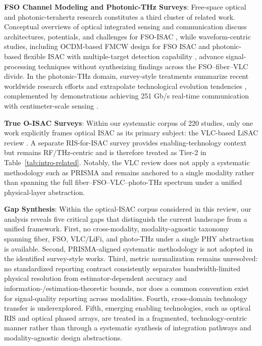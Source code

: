\textbf{FSO Channel Modeling and Photonic-THz Surveys}: Free-space optical and photonic-terahertz research constitutes a third cluster of related work. Conceptual overviews of optical integrated sensing and communication discuss architectures, potentials, and challenges for FSO-ISAC \cite{O_ISAC_021}, while waveform-centric studies, including OCDM-based FMCW design for FSO ISAC \cite{O_ISAC_035} and photonic-based flexible ISAC with multiple-target detection capability \cite{O_ISAC_058}, advance signal-processing techniques without synthesizing findings across the FSO--fiber--VLC divide. In the photonic-THz domain, survey-style treatments summarize recent worldwide research efforts and extrapolate technological evolution tendencies \cite{O_ISAC_070}, complemented by demonstrations achieving 251 Gb/s real-time communication with centimeter-scale sensing \cite{O_ISAC_016}.

\textbf{True O-ISAC Surveys}: Within our systematic corpus of 220 studies, only one work explicitly frames optical ISAC as its primary subject: the VLC-based LiSAC review \cite{O_ISAC_303}. A separate RIS-for-ISAC survey \cite{O_ISAC_163} provides enabling-technology context but remains RF/THz-centric and is therefore treated as Tier-2 in Table~\ref{tab:intro-related}. Notably, the VLC review does not apply a systematic methodology such as PRISMA and remains anchored to a single modality rather than spanning the full fiber--FSO--VLC--photo-THz spectrum under a unified physical-layer abstraction.

\textbf{Gap Synthesis}: Within the optical-ISAC corpus considered in this review, our analysis reveals five critical gaps that distinguish the current landscape from a unified framework. First, no cross-modality, modality-agnostic taxonomy spanning fiber, FSO, VLC/LiFi, and photo-THz under a single PHY abstraction is available. Second, PRISMA-aligned systematic methodology is not adopted in the identified survey-style works. Third, metric normalization remains unresolved: no standardized reporting contract consistently separates bandwidth-limited physical resolution from estimator-dependent accuracy and information-/estimation-theoretic bounds, nor does a common convention exist for signal-quality reporting across modalities. Fourth, cross-domain technology transfer is underexplored. Fifth, emerging enabling technologies, such as optical RIS and optical phased arrays, are treated in a fragmented, technology-centric manner rather than through a systematic synthesis of integration pathways and modality-agnostic design abstractions.

